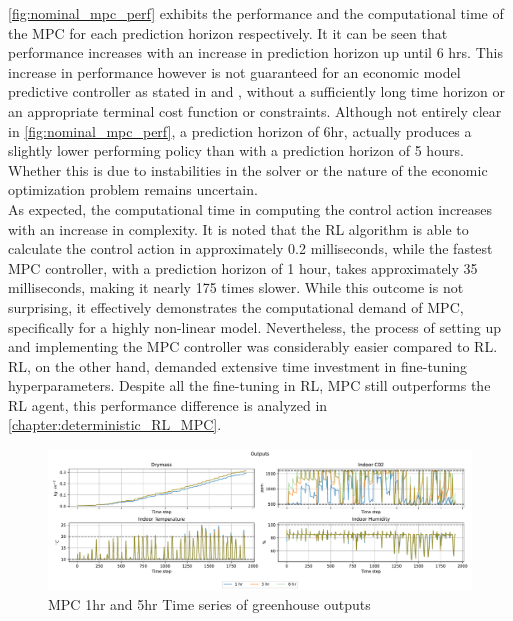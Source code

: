 \autoref{fig:nominal_mpc_perf} exhibits the performance and the computational time of the MPC for each prediction horizon respectively. It it can be seen that performance increases with an increase in prediction horizon up until 6 hrs. This increase in performance however is not guaranteed for an economic model predictive controller as stated in \cite{ellisTutorialReviewEconomic2014}  and \cite{amritEconomicOptimizationUsing2011}, without a sufficiently long time horizon or an appropriate terminal cost function or constraints. Although not entirely clear in \autoref{fig:nominal_mpc_perf}, a prediction horizon of 6hr, actually produces a slightly lower performing policy than with a prediction horizon of 5 hours. Whether this is due to instabilities in the solver or the nature of the economic optimization problem remains uncertain. \\
As expected, the computational time in computing the control action increases with an increase in complexity. It is noted that the RL algorithm is able to calculate the control action in approximately 0.2 milliseconds, while the fastest MPC controller, with a prediction horizon of 1 hour, takes approximately 35 milliseconds, making it nearly 175 times slower.  While this outcome is not surprising, it effectively demonstrates the computational demand of MPC, specifically for a highly non-linear model. Nevertheless, the process of setting up and implementing the MPC controller was considerably easier compared to RL. RL, on the other hand, demanded extensive time investment in fine-tuning hyperparameters. Despite all the fine-tuning in RL, MPC still outperforms the RL agent, this performance difference is analyzed in \autoref{chapter:deterministic_RL_MPC}. 

\begin{figure}[H]
	\centering
	\includegraphics[width=\textwidth]{figures/mpc_outputs_time_series.pdf}
	\caption{MPC 1hr and 5hr Time series of greenhouse outputs}
	\label{fig:mpc-timeseries-outputs}
\end{figure}

